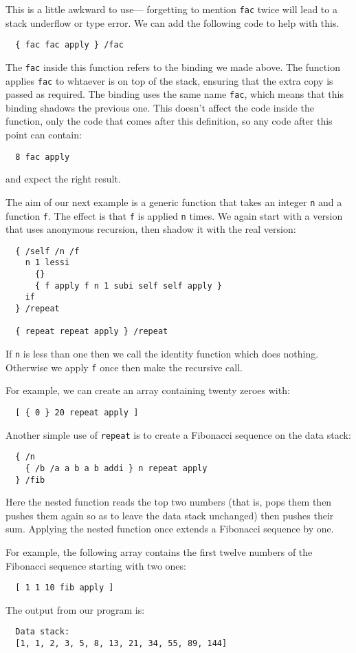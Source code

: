 This is a little awkward to use---%
forgetting to mention \verb!fac! twice will lead to a stack underflow
or type error.
We can add the following code to help with this.
\begin{verbatim}
  { fac fac apply } /fac
\end{verbatim}
The \verb!fac! inside this function refers to the binding we made above.
The function applies \verb!fac! to whtaever is on top of the stack,
ensuring that the extra copy is passed as required.
The binding uses the same name \verb!fac!,
which means that this binding shadows the previous one.
This doesn't affect the code inside the function,
only the code that comes after this definition,
so any code after this point can contain:
\begin{verbatim}
  8 fac apply
\end{verbatim}
and expect the right result.

The aim of our next example is a generic function that takes
an integer \verb!n! and a function \verb!f!.
The effect is that \verb!f! is applied \verb!n! times.
We again start with a version that uses anonymous recursion,
then shadow it with the real version:
\begin{verbatim}
  { /self /n /f
    n 1 lessi
      {}
      { f apply f n 1 subi self self apply }
    if
  } /repeat

  { repeat repeat apply } /repeat
\end{verbatim}
If \verb!n! is less than one then we call the identity function
which does nothing.
Otherwise we apply \verb!f! once then make the recursive call.

For example, we can create an array containing twenty zeroes with:
\begin{verbatim}
  [ { 0 } 20 repeat apply ]
\end{verbatim}

\noindent
Another simple use of \verb!repeat! is to create a Fibonacci sequence
on the data stack:
\begin{verbatim}
  { /n
    { /b /a a b a b addi } n repeat apply
  } /fib
\end{verbatim}
Here the nested function reads the top two numbers
(that is, pops them then pushes them again so as to leave
the data stack unchanged)
then pushes their sum.
Applying the nested function once extends a Fibonacci sequence by one.

For example,
the following array contains the first twelve numbers of
the Fibonacci sequence starting with two ones:
\begin{verbatim}
  [ 1 1 10 fib apply ]
\end{verbatim}
The output from our program is:
\begin{verbatim}
  Data stack:
  [1, 1, 2, 3, 5, 8, 13, 21, 34, 55, 89, 144]
\end{verbatim}


